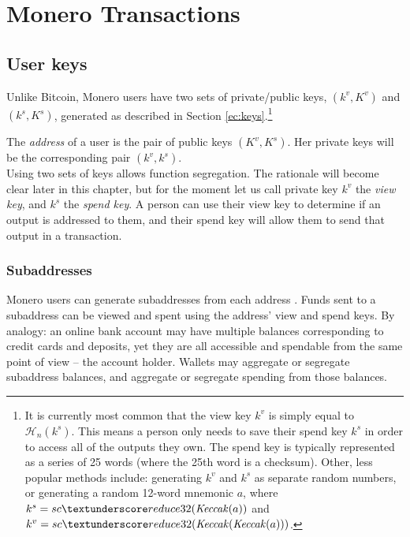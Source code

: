 

\chapter{Monero Transactions}
\label{chapter:transactions}

\section{User keys}

Unlike Bitcoin, Monero users have two sets of private/public keys, \((k^v, K^v)\) and \( (k^s, K^s) \), generated as described in Section \ref{ec:keys}.\footnote{It is currently most common that the view key $k^v$ is simply equal to $\mathcal{H}_n(k^s)$. This means a person only needs to save their spend key $k^s$ in order to access all of the outputs they own. The spend key is typically represented as a series of 25 words (where the 25th word is a checksum). Other, less popular methods include: generating $k^v$ and $k^s$ as separate random numbers, or generating a random 12-word mnemonic $a$, where $k^s = sc\textunderscore reduce32(\mathit{Keccak}(a))$ and $k^v = sc\textunderscore reduce32(\mathit{Keccak}(\mathit{Keccak}(a)))$.}

The {\em address} of a user is the pair of public keys \((K^v, K^s)\). Her private keys will be the corresponding pair \( (k^v, k^s) \).
\\

Using two sets of keys allows function segregation. The rationale will become clear later in this chapter, but for the moment let us call private key $k^v$ the {\em view key}, and $k^s$ the {\em spend key}. A person can use their view key to determine if an output is addressed to them, and their spend key will allow them to send that output in a transaction.


\subsection{Subaddresses}
\label{sec:subaddresses}

Monero users can generate subaddresses from each address \cite{MRL-0006}.  Funds sent to a subaddress can be viewed and spent using the address’ view and spend keys. By analogy: an online bank account may have multiple balances corresponding to credit cards and deposits, yet they are all accessible and spendable from the same point of view – the account holder. Wallets may aggregate or segregate subaddress balances, and aggregate or segregate spending from those balances.

